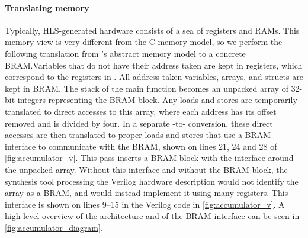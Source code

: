 \begin{figure*}
\caption{The FSMD for the example shown in \cref{fig:accumulator_c_rtl}, split
  into a data-path and control logic for the next state calculation.  The Update
  block takes the current state, current values of all registers and at most one
  value stored in the \gls{BRAM}, and calculates a new value that can either be
  stored back in the \gls{BRAM} or in a
  register.}\label{fig:accumulator_diagram}
\end{figure*}

\paragraph{Translating memory}
Typically, HLS-generated hardware consists of a sea of registers and RAMs.  This
memory view is very different from the C memory model, so we perform the
following translation from \compcert{}'s abstract memory model to a concrete
\gls{BRAM}.\@ Variables that do not have their address taken are kept in
registers, which correspond to the registers in \rtl{}.  All address-taken
variables, arrays, and structs are kept in \gls{BRAM}.  The stack of the main
function becomes an unpacked array of 32-bit integers representing the
\gls{BRAM} block.  Any loads and stores are temporarily translated to direct
accesses to this array, where each address has its offset removed and is divided
by four.  In a separate \htl{}-to-\htl{} conversion, these direct accesses are then
translated to proper loads and stores that use a \gls{BRAM} interface to
communicate with the \gls{BRAM}, shown on lines 21, 24 and 28 of
\cref{fig:accumulator_v}.  This pass inserts a \gls{BRAM} block with the
interface around the unpacked array.  Without this interface and without the
\gls{BRAM} block, the synthesis tool processing the Verilog hardware description
would not identify the array as a \gls{BRAM}, and would instead implement it
using many registers.  This interface is shown on lines 9--15 in the Verilog
code in \cref{fig:accumulator_v}.  A high-level overview of the architecture and
of the \gls{BRAM} interface can be seen in \cref{fig:accumulator_diagram}.

